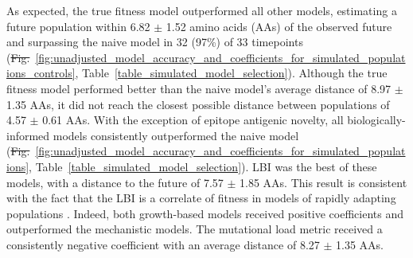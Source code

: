 \documentclass[9pt,lineno]{elife} %
\providecommand{\DIFadd}[1]{{\protect\color{blue}\uwave{#1}}} %
\providecommand{\DIFdel}[1]{{\protect\color{red}\sout{#1}}}                      %
\providecommand{\DIFaddbegin}{} %
\providecommand{\DIFaddend}{} %
\providecommand{\DIFdelbegin}{} %
\providecommand{\DIFdelend}{} %
\providecommand{\DIFaddtex}[1]{{\protect\color{blue}\uwave{#1}}} %
\providecommand{\DIFdeltex}[1]{{\protect\color{red}\sout{#1}}}                      %
\providecommand{\DIFaddbegin}{} %
\providecommand{\DIFaddend}{} %
\providecommand{\DIFdelbegin}{} %
\providecommand{\DIFdelend}{} %
\providecommand{\DIFadd}[1]{\texorpdfstring{\DIFaddtex{#1}}{#1}} %
\providecommand{\DIFdel}[1]{\texorpdfstring{\DIFdeltex{#1}}{}} %
\newcommand{\DIFscaledelfig}{0.5}
\newlength{\DIFdelgraphicswidth} %
\newlength{\DIFdelgraphicsheight} %
\newcommand{\DIFaddincludegraphics}[2][]{{\color{blue}\fbox{\DIFOincludegraphics[#1]{#2}}}} %
\newcommand{\DIFdelincludegraphics}[2][]{%
\sbox{\DIFdelgraphicsbox}{\DIFOincludegraphics[#1]{#2}}%
\settoboxwidth{\DIFdelgraphicswidth}{\DIFdelgraphicsbox} %
\settoboxtotalheight{\DIFdelgraphicsheight}{\DIFdelgraphicsbox} %
\scalebox{\DIFscaledelfig}{%
\parbox[b]{\DIFdelgraphicswidth}{\usebox{\DIFdelgraphicsbox}\\[-\baselineskip] \rule{\DIFdelgraphicswidth}{0em}}\llap{\resizebox{\DIFdelgraphicswidth}{\DIFdelgraphicsheight}{%
\setlength{\unitlength}{\DIFdelgraphicswidth}%
\begin{picture}(1,1)%
\thicklines\linethickness{2pt} %
{\color[rgb]{1,0,0}\put(0,0){\framebox(1,1){}}}%
{\color[rgb]{1,0,0}\put(0,0){\line( 1,1){1}}}%
{\color[rgb]{1,0,0}\put(0,1){\line(1,-1){1}}}%
\end{picture}%
}\hspace*{3pt}}} %
} %
\DeclareRobustCommand{\DIFaddbegin}{\DIFOaddbegin \let\includegraphics\DIFaddincludegraphics} %
\DeclareRobustCommand{\DIFaddend}{\DIFOaddend \let\includegraphics\DIFOincludegraphics} %
\DeclareRobustCommand{\DIFdelbegin}{\DIFOdelbegin \let\includegraphics\DIFdelincludegraphics} %
\DeclareRobustCommand{\DIFdelend}{\DIFOaddend \let\includegraphics\DIFOincludegraphics} %
\begin{document}
As expected, the true fitness model outperformed all other models, estimating a future population within 6.82 $\pm$ 1.52 amino acids (AAs) of the observed future and surpassing the naive model in 32 (97\%) of 33 timepoints (\DIFdelbegin \DIFdel{Fig.}\DIFdelend \DIFaddbegin \DIFadd{Figure}\DIFaddend ~\ref{fig:unadjusted_model_accuracy_and_coefficients_for_simulated_populations_controls}, Table~\ref{table_simulated_model_selection}).
Although the true fitness model performed better than the naive model's average distance of 8.97 $\pm$ 1.35 AAs, it did not reach the closest possible distance between populations of 4.57 $\pm$ 0.61 AAs.
With the exception of epitope antigenic novelty, all biologically-informed models consistently outperformed the naive model (\DIFdelbegin \DIFdel{Fig.}\DIFdelend \DIFaddbegin \DIFadd{Figure}\DIFaddend ~\ref{fig:unadjusted_model_accuracy_and_coefficients_for_simulated_populations}, Table~\ref{table_simulated_model_selection}).
LBI was the best of these models, with a distance to the future of 7.57 $\pm$ 1.85 AAs.
This result is consistent with the fact that the LBI is a correlate of fitness in models of rapidly adapting populations \DIFdelbegin %
\DIFdelend \DIFaddbegin \citep{Neher:2014eu}\DIFaddend .
Indeed, both growth-based models received positive coefficients and outperformed the mechanistic models.
The mutational load metric received a consistently negative coefficient with an average distance of 8.27 $\pm$ 1.35 AAs.
\end{document}

